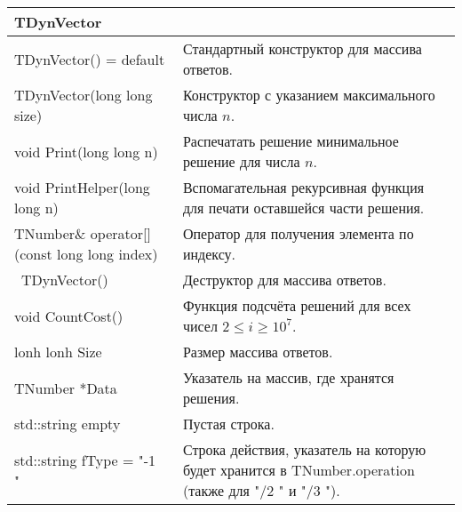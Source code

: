 \begin{longtable}{|p{7.5cm}|p{7.5cm}|}
    \hline
    \rowcolor{lightgray}
    \multicolumn{2}{|c|} {TDynVector}\\
    \hline
    TDynVector() = default&Стандартный конструктор для массива ответов.\\
    \hline
    TDynVector(long long size)&Конструктор с указанием максимального числа $n$.\\
    \hline
    void Print(long long n)&Распечатать решение минимальное решение для числа $n$.\\
    \hline
    void PrintHelper(long long n)&Вспомагательная рекурсивная функция для печати оставшейся части решения.\\
    \hline
    TNumber\& operator[](const long long index)&Оператор для получения элемента по индексу.\\
    \hline
    ~TDynVector()&Деструктор для массива ответов.\\
    \hline
    void CountCost()&Функция подсчёта решений для всех чисел $2 \leq i \geq 10^7$.\\
    \hline
    lonh lonh Size&Размер массива ответов.\\
    \hline
    TNumber *Data&Указатель на массив, где хранятся решения.\\
    \hline
    std::string empty&Пустая строка.\\
    \hline
    std::string fType = "-1 "\ &Строка действия, указатель на которую будет хранится в TNumber.operation (также для "/2 " и "/3 ").\\
    \hline
\end{longtable}


\pagebreak
